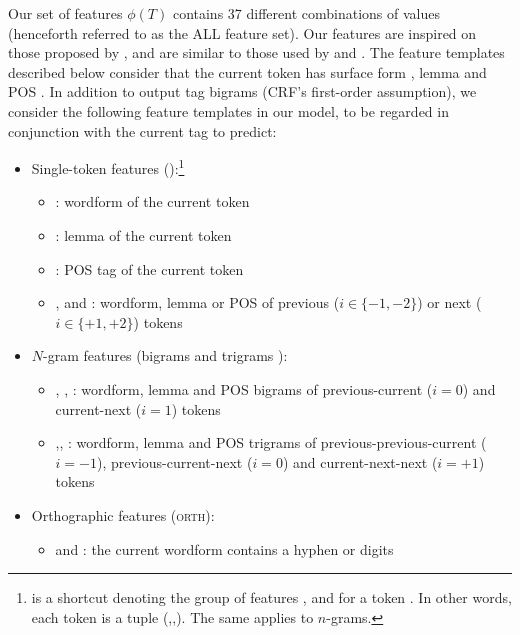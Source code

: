 \documentclass[output=paper,
modfonts
]{langscibook}
\begin{document}
Our set of features $\phi(T)$ contains 37 different combinations of values  (henceforth referred to as the {\textsc ALL} feature set). Our features are inspired on those proposed by \citet{constant-sigogne:2011:MWE}, and are similar to those used by \citet{Schneider14b} and \citet{riedl-biemann:2016:MWE}. The feature templates described below consider that the current token  has surface form , lemma  and POS . In addition to output tag bigrams (CRF's first-order assumption), we consider the following feature templates in our model, to be regarded in conjunction with the current tag to predict:
\begin{itemize}
\item Single-token features ():\footnote{ is a shortcut denoting the group of features ,  and  for a token . In other words, each token  is a tuple (,,). The same applies to $n$-grams.}
\begin{itemize}
\item {} : wordform of the current token
\item {} : lemma of the current token
\item {} : POS tag of the current token
\item {},  and : wordform, lemma or POS of previous ($i \in \{-1, -2\}$) or next ($i \in \{+1, +2\}$) tokens
\end{itemize}
\item $N$-gram features (bigrams  and trigrams ):
\begin{itemize}
\item {}, , : wordform, lemma and POS bigrams of previous-current ($i=0$) and current-next ($i=1$) tokens
\item {},, : wordform, lemma and POS trigrams of previous-previous-current ($i=-1$), previous-current-next ($i=0$) and current-next-next ($i=+1$) tokens
\end{itemize}
\item Orthographic features (\textsc{orth}):
\begin{itemize}
\item {} and : the current wordform  contains a hyphen or digits

\end{itemize}
\end{itemize}
\end{document}
